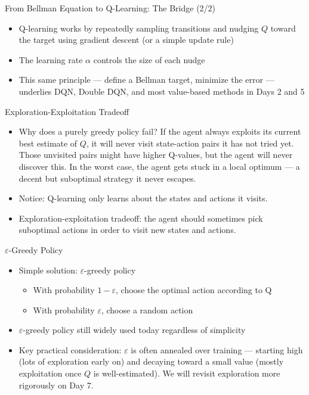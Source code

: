 \begin{frame}{From Bellman Equation to Q-Learning: The Bridge (2/2)}
\begin{itemize}
    \item Q-learning works by repeatedly sampling transitions and nudging $Q$ toward the target using gradient descent (or a simple update rule)
    \item The learning rate $\alpha$ controls the size of each nudge
    \item This same principle --- define a Bellman target, minimize the error --- underlies DQN, Double DQN, and most value-based methods in Days 2 and 5
\end{itemize}
\end{frame}

\begin{frame}{Exploration-Exploitation Tradeoff}
\begin{itemize}
    \item Why does a purely greedy policy fail? If the agent always exploits its current best estimate of $Q$, it will never visit state-action pairs it has not tried yet. Those unvisited pairs might have higher Q-values, but the agent will never discover this. In the worst case, the agent gets stuck in a local optimum --- a decent but suboptimal strategy it never escapes.
    \item Notice: Q-learning only learns about the states and actions it visits.
    \item Exploration-exploitation tradeoff: the agent should sometimes pick suboptimal actions in order to visit new states and actions.
\end{itemize}
\end{frame}

\begin{frame}{$\varepsilon$-Greedy Policy}
\begin{itemize}
    \item Simple solution: $\varepsilon$-greedy policy
    \begin{itemize}
        \item With probability $1 - \varepsilon$, choose the optimal action according to Q
        \item With probability $\varepsilon$, choose a random action
    \end{itemize}
    \item $\varepsilon$-greedy policy still widely used today regardless of simplicity
    \item Key practical consideration: $\varepsilon$ is often annealed over training --- starting high (lots of exploration early on) and decaying toward a small value (mostly exploitation once $Q$ is well-estimated). We will revisit exploration more rigorously on Day 7.
\end{itemize}
\end{frame}

